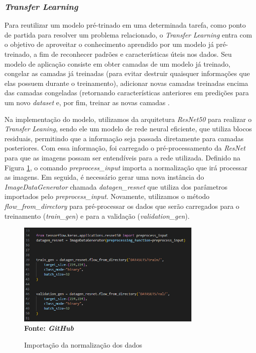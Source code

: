 \subsubsection{\esp \textit{Transfer Learning}} \label{transfer}
Para reutilizar um modelo pré-trinado em uma determinada tarefa, como ponto de partida para resolver um problema relacionado, o \textit{Transfer Learning} entra com o objetivo de aproveitar o conhecimento aprendido por um modelo já pré-treinado, a fim de reconhecer padrões e características úteis nos dados. Seu modelo de aplicação consiste em obter camadas de um modelo já treinado, congelar as camadas já treinadas (para evitar destruir quaisquer informações que elas possuem durante o treinamento), adicionar novas camadas treinadas encima das camadas congeladas (retornando características anteriores em predições para um novo \textit{dataset} e, por fim, treinar as novas camadas \cite{kerastl}.

Na implementação do modelo, utilizamos da arquitetura \textit{ResNet50} para realizar o \textit{Transfer Leaning}, sendo ele um modelo de rede neural eficiente, que utiliza blocos residuais, permitindo que a informação seja passada diretamente para camadas posteriores. Com essa informação, foi carregado o pré-processamento da \textit{ResNet} para que as imagens possam ser entendíveis para a rede utilizada. Definido na Figura \ref{fig:normaliztion}, o comando \textit{preprocess\_input} importa a normalização que irá processar as imagens. Em seguida, é necessário gerar uma nova instância do \textit{ImageDataGenerator} chamada \textit{datagen\_resnet} que utiliza dos parâmetros importados pelo \textit{preprocess\_input}. Novamente, utilizamos o método \textit{flow\_from\_directory} para pré-processar os dados que serão carregados para o treinamento (\textit{train\_gen}) e para a validação (\textit{validation\_gen}).

 \begin{figure}[ht]
 	\centering	
 	\caption[\hspace{0.1cm}Grade Computacional.]{Importação da normalização dos dados}
 	\vspace{-0.4cm}
 	\includegraphics[width=0.8\textwidth]{figuras/normalization.png}
 	\captionsetup{justification=centering}
	\vspace{-0.2cm}
     \\\textbf{\footnotesize Fonte: \textit{GitHub}}
	\label{fig:normaliztion}
\end{figure}


